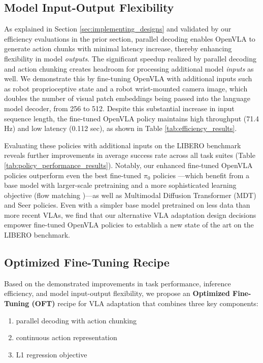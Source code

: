 \documentclass[conference]{IEEEtran}
\begin{document}
\subsection{Model Input-Output Flexibility}

As explained in Section \ref{sec:implementing_designs} and validated by our efficiency evaluations in the prior section, parallel decoding enables OpenVLA to generate action chunks with minimal latency increase, thereby enhancing flexibility in model \emph{outputs}. The significant speedup realized by parallel decoding and action chunking creates headroom for processing additional model \emph{inputs} as well. We demonstrate this by fine-tuning OpenVLA with additional inputs such as robot proprioceptive state and a robot wrist-mounted camera image, which doubles the number of visual patch embeddings being passed into the language model decoder, from 256 to 512. Despite this substantial increase in input sequence length, the fine-tuned OpenVLA policy maintains high throughput (71.4 Hz) and low latency (0.112 sec), as shown in Table \ref{tab:efficiency_results}.

Evaluating these policies with additional inputs on the LIBERO benchmark reveals further improvements in average success rate across all task suites (Table \ref{tab:policy_performance_results}). Notably, our enhanced fine-tuned OpenVLA policies outperform even the best fine-tuned $\pi_0$ policies \citep{black2024pi_0, pertsch2025fastefficientactiontokenization}---which benefit from a base model with larger-scale pretraining and a more sophisticated learning objective (flow matching \citep{lipman2022flow})---as well as Multimodal Diffusion Transformer (MDT) \citep{reuss2024multimodaldiffusiontransformerlearning} and Seer \citep{tian2024predictive} policies. Even with a simpler base model pretrained on less data than more recent VLAs, we find that our alternative VLA adaptation design decisions empower fine-tuned OpenVLA policies to establish a new state of the art on the LIBERO benchmark.



\subsection{Optimized Fine-Tuning Recipe}

Based on the demonstrated improvements in task performance, inference efficiency, and model input-output flexibility, we propose an \textbf{Optimized Fine-Tuning (OFT)} recipe for VLA adaptation that combines three key components:
\begin{enumerate}
    \item parallel decoding with action chunking
    \item continuous action representation
    \item L1 regression objective
\end{enumerate}
\end{document}
